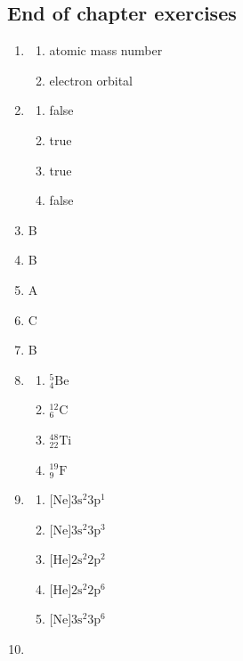\subsection{End of chapter exercises} 
\begin{multicols}{4}
\begin{enumerate}[noitemsep, label=\textbf{\arabic*}. ] 
\item %
    \begin{enumerate}[noitemsep, label=\textbf{(\alph*)} ]
    \item atomic mass number
    \item electron orbital
    \end{enumerate}
\item %
    \begin{enumerate}[noitemsep, label=\textbf{(\alph*)} ]
    \item false
    \item true
    \item true
    \item false
    \end{enumerate}
    \item B
    \item B
    \item A
    \item C
    \item B
\item %
    \begin{enumerate}[noitemsep, label=\textbf{(\alph*)} ]
    \item $^{5}_{4}\text{Be}$
    \item $^{12}_{6}\text{C}$
    \item $^{48}_{22}\text{Ti}$
    \item $^{19}_{9}\text{F}$
    \end{enumerate}
\item %
    \begin{enumerate}[noitemsep, label=\textbf{(\alph*)} ]
    \item $\text{[Ne]} 3\text{s}^2 3\text{p}^1$
    \item $\text{[Ne]} 3\text{s}^2 3\text{p}^3$
    \item $\text{[He]} 2\text{s}^2 2\text{p}^2$
    \item $\text{[He]} 2\text{s}^2 2\text{p}^6$
    \item $\text{[Ne]} 3\text{s}^2 3\text{p}^6$
    \end{enumerate}
\item %

\end{enumerate}
\end{multicols}
